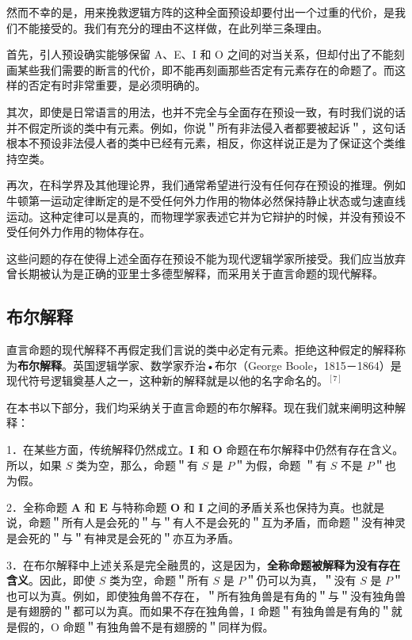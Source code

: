 然而不幸的是，用来挽救逻辑方阵的这种全面预设却要付出一个过重的代价，是我们不能接受的。我们有充分的理由不这样做，在此列举三条理由。

首先，引人预设确实能够保留 A、E、I 和 O 之间的对当关系，但却付出了不能刻画某些我们需要的断言的代价，即不能再刻画那些否定有元素存在的命题了。而这样的否定有时非常重要，是必须明确的。

其次，即使是日常语言的用法，也并不完全与全面存在预设一致，有时我们说的话并不假定所谈的类中有元素。例如，你说＂所有非法侵入者都要被起诉＂，这句话根本不预设非法侵人者的类中已经有元素，相反，你这样说正是为了保证这个类维持空类。

再次，在科学界及其他理论界，我们通常希望进行没有任何存在预设的推理。例如牛顿第一运动定律断定的是不受任何外力作用的物体必然保持静止状态或匀速直线运动。这种定律可以是真的，而物理学家表述它并为它辩护的时候，并没有预设不受任何外力作用的物体存在。

这些问题的存在使得上述全面存在预设不能为现代逻辑学家所接受。我们应当放弃曾长期被认为是正确的亚里士多德型解释，而采用关于直言命题的现代解释。

\subsection{布尔解释}

直言命题的现代解释不再假定我们言说的类中必定有元素。拒绝这种假定的解释称为\textbf{布尔解释}。英国逻辑学家、数学家乔治•布尔（George Boole，1815－1864）是现代符号逻辑奠基人之一，这种新的解释就是以他的名字命名的。$^{[7]}$

在本书以下部分，我们均采纳关于直言命题的布尔解释。现在我们就来阐明这种解释：

1．在某些方面，传统解释仍然成立。$\mathbf{I}$ 和 $\mathbf{O}$ 命题在布尔解释中仍然有存在含义。所以，如果 $S$ 类为空，那么，命题＂有 $S$ 是 $P$＂为假，命题 ＂有 $S$ 不是 $P$＂也为假。

2．全称命题 $\mathbf{A}$ 和 $\mathbf{E}$ 与特称命题 $\mathbf{O}$ 和 $\mathbf{I}$ 之间的矛盾关系也保持为真。也就是说，命题＂所有人是会死的＂与＂有人不是会死的＂互为矛盾，而命题＂没有神灵是会死的＂与＂有神灵是会死的＂亦互为矛盾。

3．在布尔解释中上述关系是完全融贯的，这是因为，\textbf{全称命题被解释为没有存在含义}。因此，即使 $S$ 类为空，命题＂所有 $S$ 是 $P$＂仍可以为真，＂没有 $S$ 是 $P$＂也可以为真。例如，即使独角兽不存在，＂所有独角兽是有角的＂与＂没有独角兽是有翅膀的＂都可以为真。而如果不存在独角兽，I 命题＂有独角兽是有角的＂就是假的，O 命题＂有独角兽不是有翅膀的＂同样为假。

